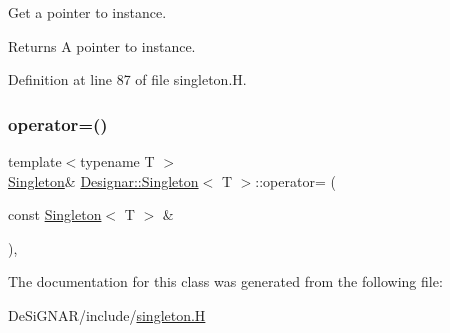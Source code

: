 Get a pointer to instance.

\begin{DoxyReturn}{Returns}
A pointer to instance. 
\end{DoxyReturn}


Definition at line 87 of file singleton.\+H.

\mbox{\label{class_designar_1_1_singleton_a8968c625d740c01211ec483142e52a58}} 
\subsubsection{\texorpdfstring{operator=()}{operator=()}}
{\footnotesize\ttfamily template$<$typename T $>$ \\
\hyperlink{class_designar_1_1_singleton}{Singleton}\& \hyperlink{class_designar_1_1_singleton}{Designar\+::\+Singleton}$<$ T $>$\+::operator= (\begin{DoxyParamCaption}\item[{const \hyperlink{class_designar_1_1_singleton}{Singleton}$<$ T $>$ \&}]{ }\end{DoxyParamCaption})\hspace{0.3cm}{\ttfamily [protected]}, {\ttfamily [delete]}}



The documentation for this class was generated from the following file\+:\begin{DoxyCompactItemize}
\item 
De\+Si\+G\+N\+A\+R/include/\hyperlink{singleton_8_h}{singleton.\+H}\end{DoxyCompactItemize}
